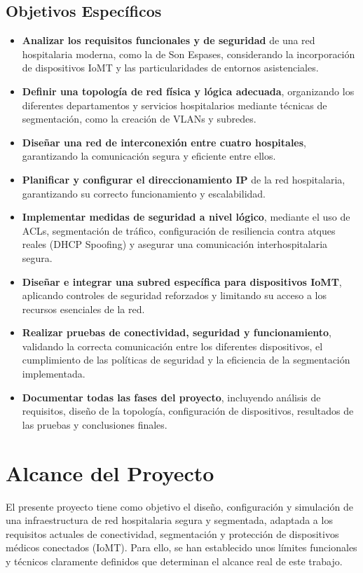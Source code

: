 \subsection{Objetivos Específicos}
\begin{itemize}
    \item \textbf{Analizar los requisitos funcionales y de seguridad} de una red hospitalaria moderna, como la de Son Espases, considerando la incorporación de dispositivos \acs{IoMT} y las 
    particularidades de entornos asistenciales.
    \item \textbf{Definir una topología de red física y lógica adecuada}, organizando los diferentes departamentos y servicios hospitalarios mediante técnicas de 
    segmentación, como la creación de \acs{VLAN}s y subredes.
    \item \textbf{Diseñar una red de interconexión entre cuatro hospitales}, garantizando la comunicación segura y eficiente entre ellos.
    \item \textbf{Planificar y configurar el direccionamiento \acs{IP}} de la red hospitalaria, garantizando su correcto funcionamiento y escalabilidad.
    \item \textbf{Implementar medidas de seguridad a nivel lógico}, mediante el uso de \acs{ACL}s, segmentación de tráfico, configuración de resiliencia contra atques reales (DHCP Spoofing) 
    y asegurar una comunicación interhospitalaria segura.
    \item \textbf{Diseñar e integrar una subred específica para dispositivos \ac{IoMT}}, aplicando controles de seguridad reforzados y limitando su acceso a los recursos esenciales de la red.
    \item \textbf{Realizar pruebas de conectividad, seguridad y funcionamiento}, validando la correcta comunicación entre los diferentes dispositivos, el cumplimiento de las políticas de 
    seguridad y la eficiencia de la segmentación implementada.
    \item \textbf{Documentar todas las fases del proyecto}, incluyendo análisis de requisitos, diseño de la topología, configuración de dispositivos, resultados de las pruebas y conclusiones 
    finales.
\end{itemize}

\section{Alcance del Proyecto}
El presente proyecto tiene como objetivo el diseño, configuración y simulación de una infraestructura de red hospitalaria segura y segmentada, adaptada a los requisitos 
actuales de conectividad, segmentación y protección de dispositivos médicos conectados (\acs{IoMT}). Para ello, se han establecido unos límites funcionales y técnicos claramente 
definidos que determinan el alcance real de este trabajo.

